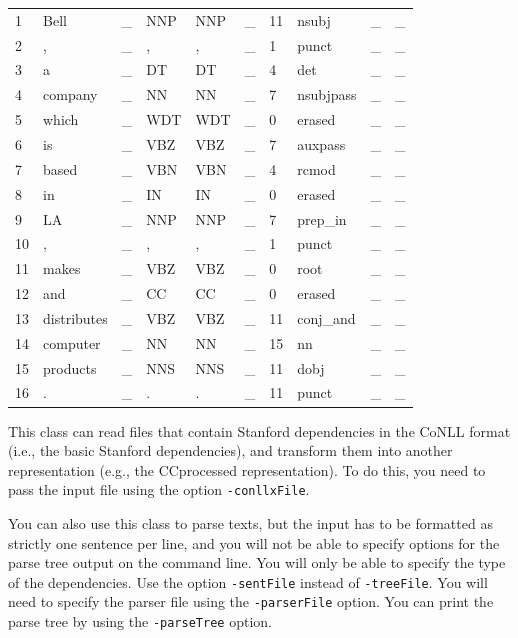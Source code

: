 \documentclass[11pt,letterpaper]{article}
\begin{document}
\bigskip

\begin{tabular}{llllllllll}
1 &	Bell&	\_ &	NNP	&NNP&	\_&	11&	nsubj&	\_&	\_ \\
2 &	, &	\_ &	, &	, &	\_ &	1 &	punct &	\_ &	\_ \\
3 &	a &	\_ &	DT &	DT &	\_ &	4 &	det &	\_ &	\_ \\
4 &	company	 & \_ &	NN &	NN &	\_ &	7 &	nsubjpass &	\_ &	\_ \\
5 &	which &	\_ &	WDT &	WDT &	\_ &	0 &	erased &	\_ &	\_ \\
6 &	is &	\_ &	VBZ &	VBZ &	\_ &	7 &	auxpass &	\_ &\_ \\
7 &	based &	\_ &	VBN &	VBN &	\_ &	4 &	rcmod &	\_ &	\_ \\
8 &	in &	\_ &	IN	 & IN &	\_ &	0 &	erased &	\_ &	\_ \\
9 &	LA &	\_ &	NNP	 & NNP &	\_ &	7 &	prep\_in	 & \_ &	\_ \\
10 &	, &	\_ &	, &	, &	\_ &	1 &	punct &	\_ &	\_ \\
11 &	makes &	\_ &	VBZ &	VBZ &	\_ &	0 &	root &	\_ &	\_ \\
12 &	and &	\_ &	CC &	CC &	\_ &	0 &	erased &	\_ &	\_ \\
13 &	distributes &	\_ &	VBZ	 & VBZ &	\_ &	11 &	conj\_and &	\_ &	\_ \\
14 &	computer &	\_ &	NN &	NN &	\_ &	15 &	nn &	\_ &	\_ \\
15 &	products &	\_ &	NNS	 & NNS &	\_ &	11 &	dobj &	\_ &	\_ \\
16 &	. &	\_ &	. &	. &	\_ &	11 &	punct &	\_ &	\_
\end{tabular}

\vspace*{.4cm}
\noindent This class can read files that contain Stanford dependencies
in the CoNLL format (i.e., the basic Stanford dependencies), and
transform them into another representation (e.g., the CCprocessed
representation). To do this, you need to pass the input file using the
option \texttt{-conllxFile}.

\bigskip

\noindent You can also use this class to parse texts, but  the input has to be formatted as strictly one sentence per line, and you will not be able to specify options for the parse tree output on the command line. You will only be able to specify the type of the dependencies. Use the option \texttt{-sentFile} instead of \texttt{-treeFile}. You will need to specify the parser file using the \texttt{-parserFile} option. You can print the parse tree by using the \texttt{-parseTree} option.
\end{document}
